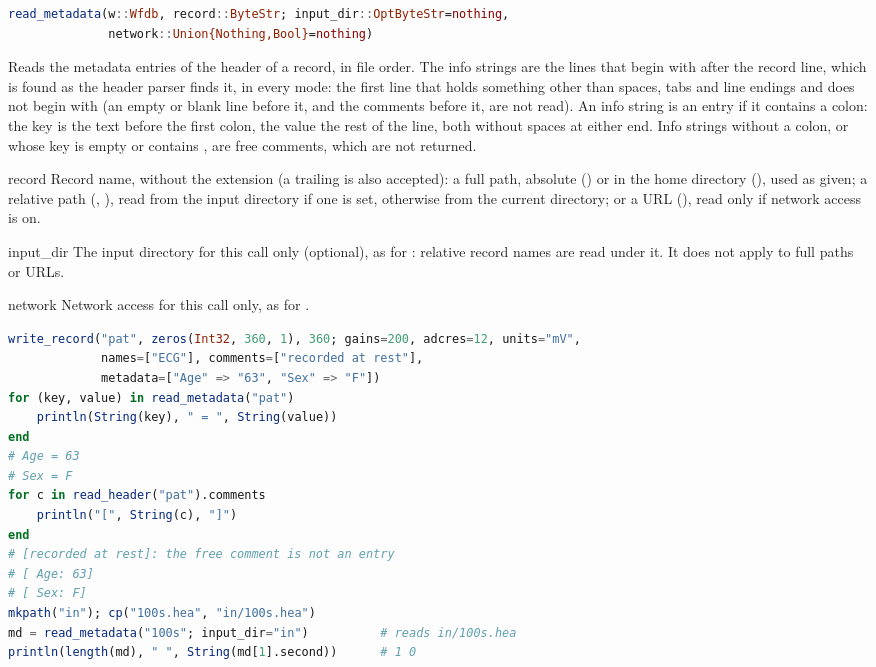 \begin{lstlisting}[language=Julia,style=signature]
read_metadata(w::Wfdb, record::ByteStr; input_dir::OptByteStr=nothing,
              network::Union{Nothing,Bool}=nothing)
\end{lstlisting}
Reads the metadata entries of the header of a record, in file order. The info strings
are the lines that begin with \code{\#} after the record line, which is found as the
header parser finds it, in every mode: the first line that holds something other than
spaces, tabs and line endings and does not begin with \code{\#} (an empty or blank line
before it, and the comments before it, are not read). An info string is an
entry if it contains a colon: the key is the text before the first colon, the value the
rest of the line, both without spaces at either end. Info strings without a colon, or
whose key is empty or contains \code{\#}, are free comments, which are not returned.
\begin{params}
\item[record] Record name, without the  extension (a trailing  is
  also accepted): a full path, absolute () or in the home
  directory (), used as given; a relative path
  (, ), read from the input directory if one is set,
  otherwise from the current directory; or a URL
  (), read only if network access is
  on.
\item[input\_dir] The input directory for this call only (optional), as for
  : relative record names are read under it. It does not apply to full
  paths or URLs.
\item[network] Network access for this call only, as for .
\end{params}
\begin{lstlisting}[language=Julia,style=example]
write_record("pat", zeros(Int32, 360, 1), 360; gains=200, adcres=12, units="mV",
             names=["ECG"], comments=["recorded at rest"],
             metadata=["Age" => "63", "Sex" => "F"])
for (key, value) in read_metadata("pat")
    println(String(key), " = ", String(value))
end
# Age = 63
# Sex = F
for c in read_header("pat").comments
    println("[", String(c), "]")
end
# [recorded at rest]: the free comment is not an entry
# [ Age: 63]
# [ Sex: F]
mkpath("in"); cp("100s.hea", "in/100s.hea")
md = read_metadata("100s"; input_dir="in")          # reads in/100s.hea
println(length(md), " ", String(md[1].second))      # 1 0
\end{lstlisting}

